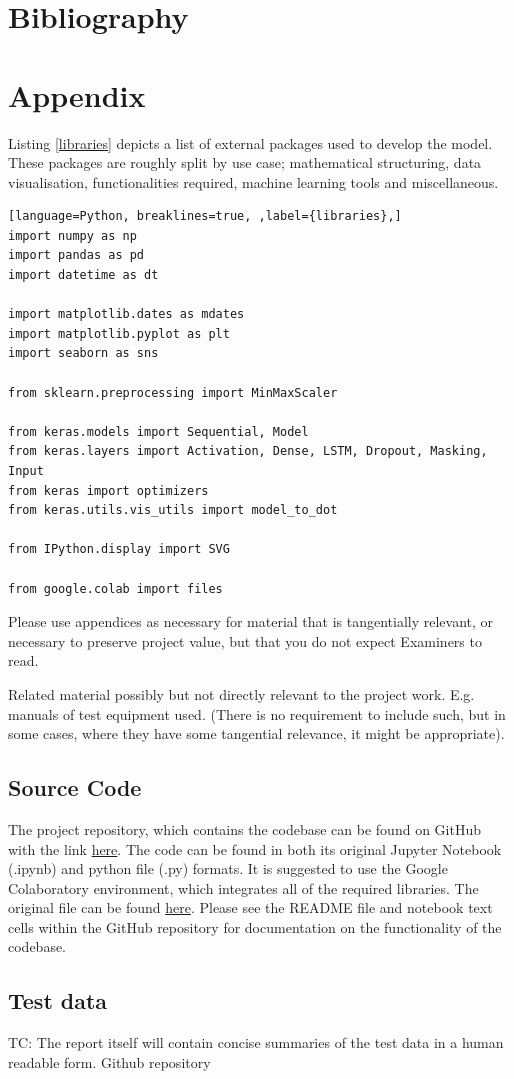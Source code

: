 \documentclass[10pt,onecolumn,letterpaper]{article}
\begin{document}
\newpage

\section{Bibliography}

{
\small


}

\newpage

\section{Appendix}
Listing \ref{libraries} depicts a list of external packages used to develop the model. These packages are roughly split by use case; mathematical structuring, data visualisation, functionalities required, machine learning tools and miscellaneous. 

\begin{lstlisting}[language=Python, breaklines=true, ,label={libraries},]
import numpy as np
import pandas as pd
import datetime as dt

import matplotlib.dates as mdates
import matplotlib.pyplot as plt
import seaborn as sns

from sklearn.preprocessing import MinMaxScaler

from keras.models import Sequential, Model
from keras.layers import Activation, Dense, LSTM, Dropout, Masking, Input
from keras import optimizers
from keras.utils.vis_utils import model_to_dot

from IPython.display import SVG

from google.colab import files
\end{lstlisting} 

Please use appendices as necessary for material that is tangentially relevant, or necessary to preserve project value, but that you do not expect Examiners to read.

Related material possibly but not directly relevant to the project work. E.g. manuals of test equipment used. (There is no requirement to include such, but in some cases, where they have some tangential relevance, it might be appropriate).

\subsection{Source Code}

The project repository, which contains the codebase can be found on GitHub with the link \href{https://github.com/twutang/SXNP-Factor-Models}{here}. The code can be found in both its original Jupyter Notebook (.ipynb) and python file (.py) formats. It is suggested to use the Google Colaboratory environment, which integrates all of the required libraries. The original file can be found \href{https://colab.research.google.com/drive/1IHPEI-sPNSS0rKdFThywR4LTpeOt0Z_y}{here}. Please see the README file and notebook text cells within the GitHub repository for documentation on the functionality of the codebase. 

\subsection{Test data}
TC: The report itself will contain concise summaries of the test data in a human readable form.
Github repository
\end{document}
